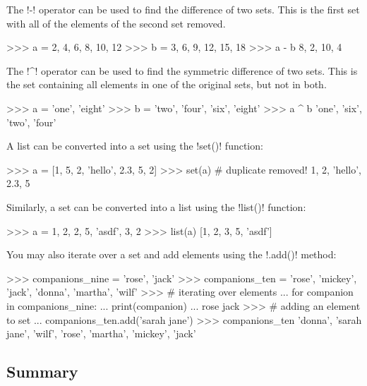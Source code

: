 \documentclass[11pt]{cselabheader}
\begin{document}
The \pythoninline!-! operator can be used to find the difference of two sets.
This is the first set with all of the elements of the second set removed.
\begin{pyconcode}
>>> a = {2, 4, 6, 8, 10, 12}
>>> b = {3, 6, 9, 12, 15, 18}
>>> a - b
{8, 2, 10, 4}
\end{pyconcode}

The \pythoninline!^! operator can be used to find the symmetric difference
of two sets. This is the set containing all elements in one of the original
sets, but not in both.
\begin{pyconcode}
>>> a = {'one', 'eight'}
>>> b = {'two', 'four', 'six', 'eight'}
>>> a ^ b
{'one', 'six', 'two', 'four'}
\end{pyconcode}

A list can be converted into a set using the \pythoninline!set()! function:
\begin{pyconcode}
>>> a = [1, 5, 2, 'hello', 2.3, 5, 2]
>>> set(a) # duplicate removed!
{1, 2, 'hello', 2.3, 5}
\end{pyconcode}

Similarly, a set can be converted into a list using the \pythoninline!list()!
function:
\begin{pyconcode}
>>> a = {1, 2, 2, 5, 'asdf', 3, 2}
>>> list(a)
[1, 2, 3, 5, 'asdf']
\end{pyconcode}

You may also iterate over a set and add elements using the
\pythoninline!.add()! method:
\begin{pyconcode}
>>> companions_nine = {'rose', 'jack'}
>>> companions_ten = {'rose', 'mickey', 'jack', 'donna', 'martha', 'wilf'}
>>> # iterating over elements
... for companion in companions_nine:
...     print(companion)
...
rose
jack
>>> # adding an element to set
... companions_ten.add('sarah jane')
>>> companions_ten
{'donna', 'sarah jane', 'wilf', 'rose', 'martha', 'mickey', 'jack'}
\end{pyconcode}

\subsection{Summary}
\end{document}
